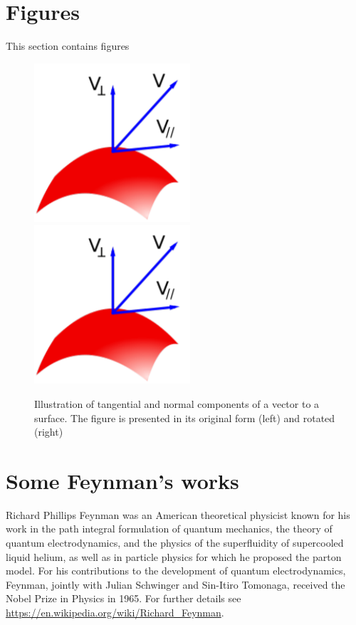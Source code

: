 \documentclass[12pt]{article}
\begin{document}
\section{Figures}
\label{sec:Figs}

This section contains figures
\\
\begin{figure}[!ht]
    \centering
    \includegraphics[scale=0.5]{week 4/Diagram.png}
    \includegraphics[angle=45,scale=0.5]{week 4/Diagram.png}
    \caption{Illustration of tangential and normal components of a vector to a surface. The figure is presented in its original form (left) and rotated (right)}
    \label{fig:my_label}
\end{figure}



\section{Some Feynman's works}
\label{sec:Feynman}
Richard Phillips Feynman %
was an American theoretical physicist known for his work in the path integral formulation of quantum mechanics, the theory of quantum electrodynamics, and the physics of the superfluidity of supercooled liquid helium, as well as in particle physics for which he proposed the parton model. For his contributions to the development of quantum electrodynamics, Feynman, jointly with Julian Schwinger and Sin-Itiro Tomonaga, received the Nobel Prize in Physics in 1965. For further details see \url{https://en.wikipedia.org/wiki/Richard_Feynman}.
\end{document}
